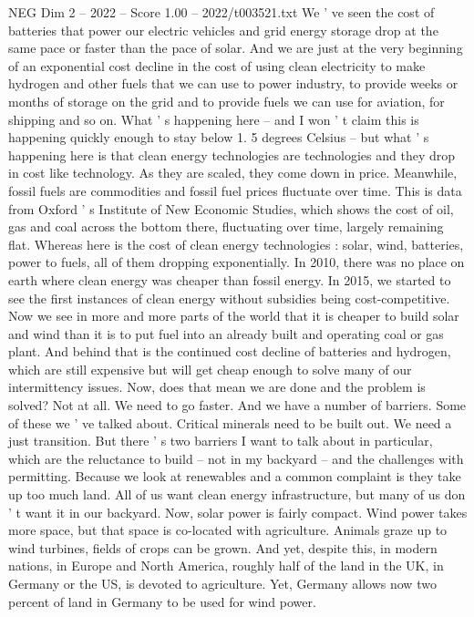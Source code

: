 \begin{textsample}{NEG Dim 2 – 2022 – Score 1.00 – 2022/t003521.txt}
We ' ve seen the cost of batteries that power our electric vehicles and grid energy storage drop at the same pace or faster than the pace of solar.
And we are just at the very beginning of an exponential cost decline in the cost of using clean electricity to make hydrogen and other fuels that we can use to power industry, to provide weeks or months of storage on the grid and to provide fuels we can use for aviation, for shipping and so on.
What ' s happening here -- and I won ' t claim this is happening quickly enough to stay below 1. 5 degrees Celsius -- but what ' s happening here is that clean energy technologies are technologies and they drop in cost like technology.
As they are scaled, they come down in price.
Meanwhile, fossil fuels are commodities and fossil fuel prices fluctuate over time.
This is data from Oxford ' s Institute of New Economic Studies, which shows the cost of oil, gas and coal across the bottom there, fluctuating over time, largely remaining flat.
Whereas here is the cost of clean energy technologies : solar, wind, batteries, power to fuels, all of them dropping exponentially.
In 2010, there was no place on earth where clean energy was cheaper than fossil energy.
In 2015, we started to see the first instances of clean energy without subsidies being cost-competitive.
Now we see in more and more parts of the world that it is cheaper to build solar and wind than it is to put fuel into an already built and operating coal or gas plant.
And behind that is the continued cost decline of batteries and hydrogen, which are still expensive but will get cheap enough to solve many of our intermittency issues.
Now, does that mean we are done and the problem is solved?
Not at all.
We need to go faster.
And we have a number of barriers.
Some of these we ' ve talked about.
Critical minerals need to be built out.
We need a just transition.
But there ' s two barriers I want to talk about in particular, which are the reluctance to build -- not in my backyard -- and the challenges with permitting.
Because we look at renewables and a common complaint is they take up too much land.
All of us want clean energy infrastructure, but many of us don ' t want it in our backyard.
Now, solar power is fairly compact.
Wind power takes more space, but that space is co-located with agriculture.
Animals graze up to wind turbines, fields of crops can be grown.
And yet, despite this, in modern nations, in Europe and North America, roughly half of the land in the UK, in Germany or the US, is devoted to agriculture.
Yet, Germany allows now two percent of land in Germany to be used for wind power.

\end{textsample}
